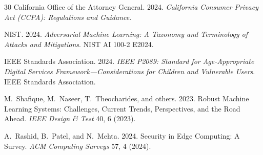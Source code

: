 \documentclass[sigconf,nonacm]{acmart}
\begin{document}
\begin{thebibliography}{30}
California Office of the Attorney General. 2024. \textit{California
Consumer Privacy Act (CCPA): Regulations and Guidance}.

NIST. 2024. \textit{Adversarial Machine Learning: A Taxonomy and
Terminology of Attacks and Mitigations}. NIST AI 100-2 E2024.

IEEE Standards Association. 2024. \textit{IEEE P2089: Standard
for Age-Appropriate Digital Services Framework---Considerations for
Children and Vulnerable Users}. IEEE Standards Association.

M.~Shafique, M.~Naseer, T.~Theocharides, and others. 2023. Robust
Machine Learning Systems: Challenges, Current Trends,
Perspectives, and the Road Ahead.
\textit{IEEE Design \& Test} 40, 6 (2023).

A.~Rashid, B.~Patel, and N.~Mehta. 2024. Security in Edge
Computing: A Survey. \textit{ACM Computing Surveys} 57, 4 (2024).

\end{thebibliography}
\end{document}
